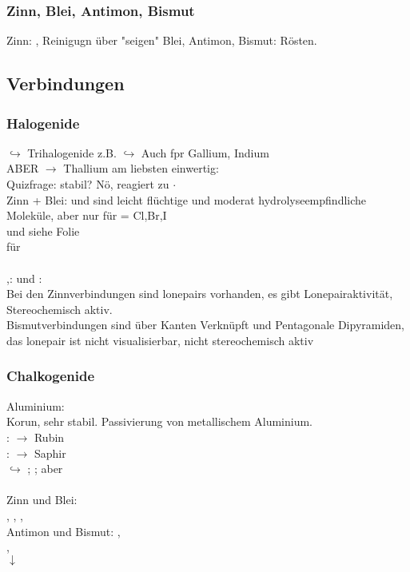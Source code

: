 \documentclass{article}
\begin{document}
\subsubsection{Zinn, Blei, Antimon, Bismut}
Zinn: , Reinigugn über "seigen"
Blei, Antimon, Bismut: Rösten.

\subsection{Verbindungen}
\subsubsection{Halogenide}
$\hookrightarrow$ Trihalogenide z.B. 
$\hookrightarrow$ Auch fpr Gallium, Indium\\
ABER $\rightarrow$ Thallium am liebsten einwertig: \\
Quizfrage:  stabil? Nö, reagiert zu  $\cdot$ \\
Zinn + Blei:  und  sind leicht flüchtige und moderat hydrolyseempfindliche Moleküle, aber nur für  = Cl,Br,I\\
 und  siehe Folie\\
für \\
\\
,:   und :\\
Bei den Zinnverbindungen sind lonepairs vorhanden, es gibt Lonepairaktivität, Stereochemisch aktiv.\\
Bismutverbindungen sind über Kanten Verknüpft und Pentagonale Dipyramiden, das lonepair ist nicht visualisierbar, nicht stereochemisch aktiv\\

\subsubsection{Chalkogenide}
Aluminium: \\
Korun, sehr stabil. Passivierung von metallischem Aluminium.\\
: $\rightarrow$ Rubin\\
: $\rightarrow$ Saphir\\
$\hookrightarrow$ ; ; aber \\\\
Zinn und Blei:\\
 ,  ,  , \\
Antimon und Bismut:
, \\
, \\
$\downarrow$\\
\end{document}
